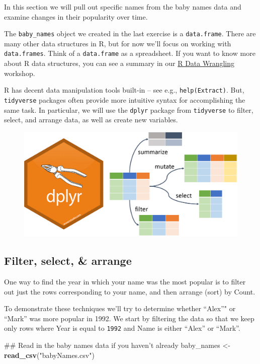 \documentclass[]{book}
\newenvironment{Shaded}{\begin{snugshade}}{\end{snugshade}}
\newcommand{\KeywordTok}[1]{\textcolor[rgb]{0.13,0.29,0.53}{\textbf{#1}}}
\newcommand{\StringTok}[1]{\textcolor[rgb]{0.31,0.60,0.02}{#1}}
\newcommand{\NormalTok}[1]{#1}
\begin{document}
In this section we will pull out specific names from the baby names data
and examine changes in their popularity over time.

The \texttt{baby\_names} object we created in the last exercise is a
\texttt{data.frame}. There are many other data structures in R, but for
now we'll focus on working with \texttt{data.frames}. Think of a
\texttt{data.frame} as a spreadsheet. If you want to know more about R
data structures, you can see a summary in our
\href{./RDataWrangling.html\#data-types-and-structures}{R Data
Wrangling} workshop.

R has decent data manipulation tools built-in -- see e.g.,
\texttt{help(Extract)}. But, \texttt{tidyverse} packages often provide
more intuitive syntax for accomplishing the same task. In particular, we
will use the \texttt{dplyr} package from \texttt{tidyverse} to filter,
select, and arrange data, as well as create new variables.

\begin{figure}
\centering
\includegraphics{R/Rintro/images/dplyr.png}
\caption{}
\end{figure}

\subsection{Filter, select, \& arrange}\label{filter-select-arrange}

One way to find the year in which your name was the most popular is to
filter out just the rows corresponding to your name, and then arrange
(sort) by Count.

To demonstrate these techniques we'll try to determine whether ``Alex''"
or ``Mark'' was more popular in 1992. We start by filtering the data so
that we keep only rows where Year is equal to \texttt{1992} and Name is
either ``Alex'' or ``Mark''.

\begin{Shaded}
\begin{Highlighting}[]
\NormalTok{## Read in the baby names data if you haven't already}
\NormalTok{baby_names <-}\StringTok{ }\KeywordTok{read_csv}\NormalTok{(}\StringTok{"babyNames.csv"}\NormalTok{)}
\end{Highlighting}
\end{Shaded}
\end{document}
